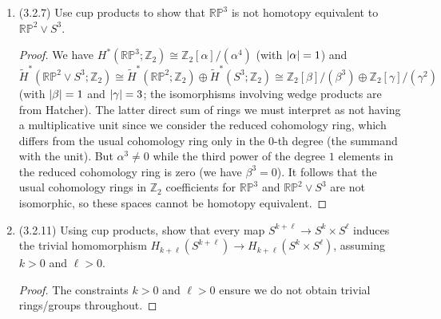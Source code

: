 \documentclass[11pt]{article}
\begin{document}
\begin{enumerate}
\begin{proof}
        Any map $\mathbb{RP}^n\to \mathbb{RP}^m$ with $n>m$ induces a ring homomorphism $\varphi\colon H^\ast(\mathbb{RP}^m;\mathbb{Z}_2)\cong \mathbb{Z}_2[\alpha]/(\alpha^{m+1})\to H^\ast(\mathbb{RP}^n;\mathbb{Z}_2)\cong \mathbb{Z}_2[\beta]/(\beta^{n+1})$ (with $\abs{\alpha},\abs{\beta}=1$). Any such ring homomorphism $\varphi$ is determined by the image of $\alpha$. But since $\alpha^{m+1} = 0$, we must also have $\varphi(\alpha)^{m+1} = 0$. Since the smallest power of $\beta$ which is zero is $n+1$, we cannot have $\varphi(\alpha) = \beta$; that is, we cannot have a nontrivial map $H^1(\mathbb{RP}^m;\mathbb{Z}_2)\to H^1(\mathbb{RP}^n;\mathbb{Z}_2)$ (the generator for $H^1$ has to be mapped into some higher cohomology group or zero).

        Similarly, no maps $\mathbb{CP}^n\to\mathbb{CP}^m$ for $n>m$ induce nontrivial maps $H^2(\mathbb{CP}^m;\mathbb{Z})\to H^2(\mathbb{CP}^n;\mathbb{Z})$ since any ring homomorphism $\varphi\colon H^\ast(\mathbb{CP}^m;\mathbb{Z})\cong \mathbb{Z}[\alpha]/(\alpha^{m+1})\to H^\ast(\mathbb{CP}^n;\mathbb{Z})\cong \mathbb{Z}[\beta]/(\beta^{n+1})$ (with $\abs{\alpha},\abs{\beta} = 2$) must take the generator $\alpha$ to an element of some higher cohomology group or zero in order for $\varphi(\alpha)^{m+1}$ to vanish.
    \end{proof}
    \item (3.2.7) Use cup products to show that $\mathbb{RP}^3$ is not homotopy equivalent to $\mathbb{RP}^2\vee S^3$. \begin{proof}
        We have $H^\ast(\mathbb{RP}^3;\mathbb{Z}_2)\cong\mathbb{Z}_2[\alpha]/(\alpha^4)$ (with $\abs{\alpha} =1$) and $\tilde H^\ast(\mathbb{RP}^2\vee S^3;\mathbb{Z}_2)\cong \tilde H^\ast(\mathbb{RP}^2;\mathbb{Z}_2)\oplus \tilde H^\ast(S^3;\mathbb{Z}_2)\cong \mathbb{Z}_2[\beta]/(\beta^3)\oplus \mathbb{Z}_2[\gamma]/(\gamma^2)$ (with $\abs{\beta} = 1$ and $\abs{\gamma} = 3$; the isomorphisms involving wedge products are from Hatcher). The latter direct sum of rings we must interpret as not having a multiplicative unit since we consider the reduced cohomology ring, which differs from the usual cohomology ring only in the $0$-th degree (the summand with the unit). But $\alpha^3 \neq 0$ while the third power of the degree $1$ elements in the reduced cohomology ring is zero (we have $\beta^3 = 0$). It follows that the usual cohomology rings in $\mathbb{Z}_2$ coefficients for $\mathbb{RP}^3$ and $\mathbb{RP}^2\vee S^3$ are not isomorphic, so these spaces cannot be homotopy equivalent.
    \end{proof}
    \item (3.2.11) Using cup products, show that every map $S^{k+\ell}\to S^k\times S^\ell$ induces the trivial homomorphism $H_{k+\ell}(S^{k+\ell})\to H_{k+\ell}(S^k\times S^\ell)$, assuming $k>0$ and $\ell>0$. \begin{proof}
        The constraints $k>0$ and $\ell>0$ ensure we do not obtain trivial rings/groups throughout.
        

\end{proof}
\end{enumerate}
\end{document}
